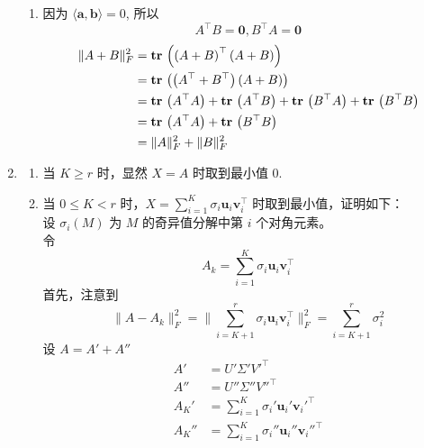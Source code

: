 \documentclass[11pt,letter,notitlepage]{article}
\DeclareMathOperator*{\tr}{\bf tr\,}
\begin{document}
\begin{solution}
\begin{enumerate}
\begin{enumerate}
                  \item 因为 $\langle \mathbf{a},\mathbf{b} \rangle=0$, 所以
                        $$A^\top B=\mathbf{0}, B^\top A=\mathbf{0}$$
                        $$\begin{aligned}
                                \|A+B\|_F^2
                                 & = \tr \left( \left(A+B\right)^\top \left(A+B\right) \right)                                                              \\
                                 & = \tr \left( \left(A^\top+B^\top\right) \left(A+B\right) \right)                                                         \\
                                 & = \tr \left( A^\top A \right) + \tr \left( A^\top B \right) + \tr \left( B^\top A \right)  + \tr \left( B^\top B \right) \\
                                 & =\tr \left( A^\top A \right) + \tr \left( B^\top B \right)                                                               \\
                                 & = \|A\|_F^2 +\|B\|_F^2
                            \end{aligned}$$
              \end{enumerate}
        \item \begin{enumerate}
                  \item 当 $K\geq r$ 时，显然 $X=A$ 时取到最小值 $0$.
                  \item 当 $0 \leq K <r$ 时，$X=\sum_{i=1}^K \sigma_i \mathbf{u}_i\mathbf{v}_i^\top$ 时取到最小值，证明如下：\\
                  设 $\sigma_i(M)$ 为 $M$ 的奇异值分解中第 $i$ 个对角元素。\\
                  令 $$A_k=\sum_{i=1}^K \sigma_i \mathbf{u}_i\mathbf{v}_i^\top$$
                        首先，注意到 $$\|A-A_k\|_F^2=\|\sum_{i=K+1}^r \sigma_i \mathbf{u}_i\mathbf{v}_i^\top\|_F^2=\sum_{i=K+1}^r \sigma_i^2$$
                        设 $A=A'+A''$\\
                        $$\begin{aligned}
                            A' &= U'\Sigma'V'^\top \\
                            A'' &= U''\Sigma''V''^\top \\
                            A_K'&= \sum_{i=1}^K \sigma_i' \mathbf{u}_i'\mathbf{v}_i'^\top \\
                            A_K''&=\sum_{i=1}^K \sigma_i'' \mathbf{u}_i'' \mathbf{v}_i''^\top

\end{aligned}$$
\end{enumerate}
\end{enumerate}
\end{solution}
\end{document}
